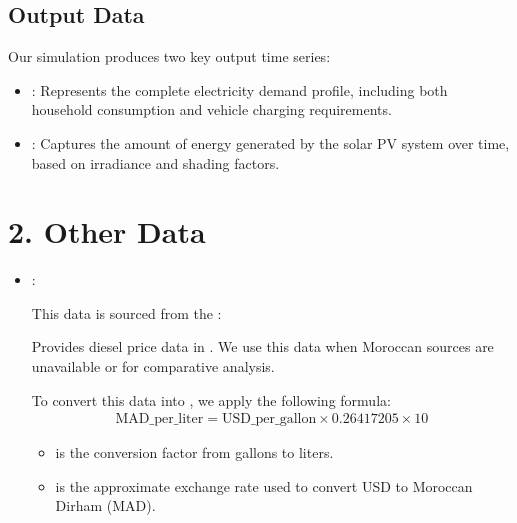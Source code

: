 \documentclass[letterpaper,10pt,english]{sphinxmanual}
\begin{document}
\subsection{Output Data}
\label{\detokenize{index:output-data}}
\sphinxAtStartPar
Our simulation produces two key output time series:
\begin{itemize}
\item {} 
\sphinxAtStartPar
{}:
Represents the complete electricity demand profile, including both household consumption and vehicle charging requirements.

\item {} 
\sphinxAtStartPar
{}:
Captures the amount of energy generated by the solar PV system over time, based on irradiance and shading factors.

\end{itemize}


\section{2. Other Data}
\label{\detokenize{index:other-data}}\begin{itemize}
\item {} 
\sphinxAtStartPar
{}:

\sphinxAtStartPar
This data is sourced from the : 

\sphinxAtStartPar
Provides diesel price data in . We use this data when Moroccan sources are unavailable or for comparative analysis.

\sphinxAtStartPar
To convert this data into , we apply the following formula:
\begin{equation*}
\begin{split}\text{MAD_per_liter} = \text{USD_per_gallon} \times 0.26417205 \times 10\end{split}
\end{equation*}\begin{itemize}
\item {} 
\sphinxAtStartPar
{} is the conversion factor from gallons to liters.

\item {} 
\sphinxAtStartPar
{} is the approximate exchange rate used to convert USD to Moroccan Dirham (MAD).

\end{itemize}

\end{itemize}
\end{document}
